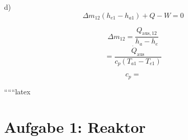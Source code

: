 d) \quad {}
\[
\Delta m_{12} (h_{e1} - h_{a1}) + Q - W = 0
\]

\[
\Delta m_{12} = \frac{Q_{\text{aus}, 12}}{h_a - h_e}
\]
\[
= \frac{\dot{Q}_{\text{aus}}}{c_p (T_{a1} - T_{e1})}
\]

\[
c_p =
\]

``````latex


\section*{Aufgabe 1: Reaktor}